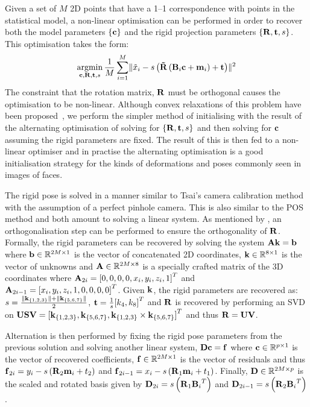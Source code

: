Given a set of $M$ 2D points that have a 1--1 correspondence with points in the
statistical model, a non-linear optimisation can be performed in order to
recover both the model parameters $\{\boldsymbol{\mathbf{c}}\}$ and the rigid projection parameters
$\{\boldsymbol{\mathbf{R}}, \boldsymbol{\mathbf{t}}, s\}$. This optimisation takes the form:
\begin{equation}
\argmin_{\bb{c}, \bb{R}, \bb{t}, s} \frac{1}{M} \sum_{i=1}^M \lVert \tilde{x}_i - s \left( \bb{\tilde{R}} \left(\bb{B}_i \bb{c} + \bb{m}_i\right) + \bb{t} \right) \rVert^2
\end{equation}
The constraint that the rotation matrix, $\boldsymbol{\mathbf{R}}$ must be orthogonal causes
the optimisation to be non-linear. Although convex relaxations of this problem
have been proposed~\cite{zhou20153d}, we perform the simpler method of
initialising with the result of the alternating optimisation of solving for
$\{\boldsymbol{\mathbf{R}}, \boldsymbol{\mathbf{t}}, s\}$ and then solving for $\boldsymbol{\mathbf{c}}$ assuming the rigid parameters
are fixed. The result of this is then fed to a non-linear optimiser and in practise
the alternating optimisation is a good initialisation strategy for the kinds
of deformations and poses commonly seen in images of faces.

The rigid pose is solved in a manner similar to Tsai's camera
calibration method~\cite{tsai1987versatile} with the assumption of a perfect
pinhole camera. This is also similar to the POS~\cite{dementhon1995model}
method and both amount to solving a linear system.
As mentioned by \citet{bas2016fitting}, an orthogonalisation step can be
performed to ensure the orthogonality of $\boldsymbol{\mathbf{R}}$.
Formally, the rigid parameters can be recovered by solving the system
$\boldsymbol{\mathbf{A}}\boldsymbol{\mathbf{k}} = \boldsymbol{\mathbf{b}}$ where $\boldsymbol{\mathbf{b}} \in \mathbb{R}^{2M \times 1}$ is the vector
of concatenated 2D coordinates, $\boldsymbol{\mathbf{k}} \in \mathbb{R}^{8 \times 1}$ is the vector of
unknowns and $\boldsymbol{\mathbf{A}} \in \mathbb{R}^{2M \times 8}$ is a specially crafted matrix
of the 3D coordinates where $\boldsymbol{\mathbf{A}}_{2i} = {[0, 0, 0, 0, x_i, y_i, z_i, 1]}^T$ and
$\boldsymbol{\mathbf{A}}_{2i -1} = {[x_i, y_i, z_i, 1, 0, 0, 0, 0]}^T$. Given $\boldsymbol{\mathbf{k}}$, the rigid
parameters are recovered as:
$s = \frac{\lVert{} \boldsymbol{\mathbf{k}}_{\{1,2,3\}} \rVert + \lVert{} \boldsymbol{\mathbf{k}}_{\{5,6,7\}} \rVert}{2}$, $\boldsymbol{\mathbf{t}} = \frac{1}{s} {[k_4, k_8]}^T$
and $\boldsymbol{\mathbf{R}}$ is recovered by performing an SVD on
$\boldsymbol{\mathbf{U}}\boldsymbol{\mathbf{S}}\boldsymbol{\mathbf{V}} = {[\boldsymbol{\mathbf{k}}_{\{1,2,3\}}, \boldsymbol{\mathbf{k}}_{\{5,6,7\}}, \boldsymbol{\mathbf{k}}_{\{1,2,3\}} \times \boldsymbol{\mathbf{k}}_{\{5,6,7\}}]}^T$
and thus $\boldsymbol{\mathbf{R}} = \boldsymbol{\mathbf{U}}\boldsymbol{\mathbf{V}}$.

Alternation is then performed by fixing the rigid pose parameters from the previous
solution and solving another linear system, $\boldsymbol{\mathbf{D}}\boldsymbol{\mathbf{c}} = \boldsymbol{\mathbf{f}}$ where
$\boldsymbol{\mathbf{c}} \in \mathbb{R}^{p \times 1}$ is the vector of recovered coefficients,
$\boldsymbol{\mathbf{f}} \in \mathbb{R}^{2M \times 1}$ is the vector of residuals and thus
$\boldsymbol{\mathbf{f}}_{2i} = y_i - s \left(\boldsymbol{\mathbf{R}}_2 \boldsymbol{\mathbf{m}}_i + t_2 \right)$ and
$\boldsymbol{\mathbf{f}}_{2i - 1} = x_i - s \left(\boldsymbol{\mathbf{R}}_1 \boldsymbol{\mathbf{m}}_i + t_1 \right)$. Finally,
$\boldsymbol{\mathbf{D}} \in \mathbb{R}^{2M \times p}$ is the scaled and rotated basis given by
$\boldsymbol{\mathbf{D}}_{2i} = s \left( \boldsymbol{\mathbf{R}}_1 {\boldsymbol{\mathbf{B}}_i}^T \right)$ and
$\boldsymbol{\mathbf{D}}_{2i - 1} = s \left( \boldsymbol{\mathbf{R}}_2 {\boldsymbol{\mathbf{B}}_i}^T \right)$.
